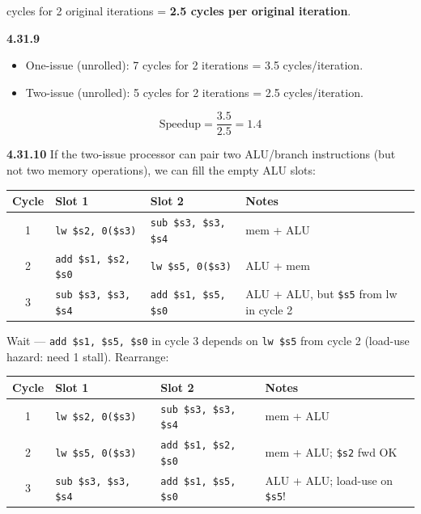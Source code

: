  cycles for 2 original iterations = \textbf{2.5 cycles per
original iteration}.

\medskip\noindent\textbf{4.31.9}
\begin{itemize}
\item One-issue (unrolled): 7 cycles for 2 iterations = 3.5 cycles/iteration.
\item Two-issue (unrolled): 5 cycles for 2 iterations = 2.5 cycles/iteration.
\end{itemize}
\[
\text{Speedup} = \frac{3.5}{2.5} = 1.4
\]

\medskip\noindent\textbf{4.31.10}
If the two-issue processor can pair two ALU/branch instructions (but not two
memory operations), we can fill the empty ALU slots:

\begin{center}
\begin{tabular}{clll}
\toprule
\textbf{Cycle} & \textbf{Slot 1} & \textbf{Slot 2} & \textbf{Notes} \\
\midrule
1 & \texttt{lw \$s2, 0(\$s3)} & \texttt{sub \$s3, \$s3, \$s4} & mem + ALU \\
2 & \texttt{add \$s1, \$s2, \$s0} & \texttt{lw \$s5, 0(\$s3)} & ALU + mem \\
3 & \texttt{sub \$s3, \$s3, \$s4} & \texttt{add \$s1, \$s5, \$s0} & ALU + ALU, but \texttt{\$s5} from lw in cycle 2 \\
\bottomrule
\end{tabular}
\end{center}

\noindent Wait --- \texttt{add \$s1, \$s5, \$s0} in cycle 3 depends on
\texttt{lw \$s5} from cycle 2 (load-use hazard: need 1 stall).  Rearrange:

\begin{center}
\begin{tabular}{clll}
\toprule
\textbf{Cycle} & \textbf{Slot 1} & \textbf{Slot 2} & \textbf{Notes} \\
\midrule
1 & \texttt{lw \$s2, 0(\$s3)} & \texttt{sub \$s3, \$s3, \$s4} & mem + ALU \\
2 & \texttt{lw \$s5, 0(\$s3)} & \texttt{add \$s1, \$s2, \$s0} & mem + ALU; \texttt{\$s2} fwd OK \\
3 & \texttt{sub \$s3, \$s3, \$s4} & \texttt{add \$s1, \$s5, \$s0} & ALU + ALU; load-use on \texttt{\$s5}! \\
\bottomrule
\end{tabular}
\end{center}

